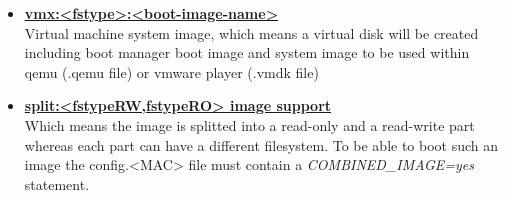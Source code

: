 \begin{itemize}
	\item \textbf{\underline{vmx:<fstype>:<boot-image-name>}}\\
          Virtual machine system image, which means a virtual disk will
          be created including boot manager boot image and system image
          to be used within qemu (.qemu file) or vmware player (.vmdk file)
	\item \textbf{\underline{split:<fstypeRW,fstypeRO> image support}}\\
          Which means the image is splitted into a read-only and a
          read-write part whereas each part can have a different
          filesystem. To be able to boot such an image the config.<MAC>
          file must contain a \textit{COMBINED\_IMAGE=yes} statement.
\end{itemize}
